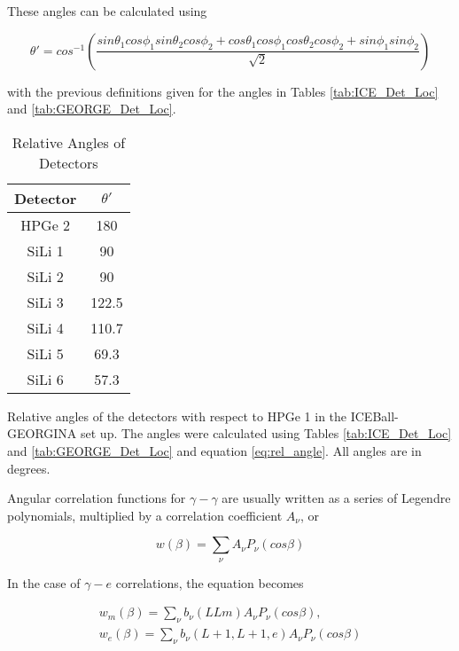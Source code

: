 These angles can be calculated using

\begin{equation}
    \theta ' = cos^{-1}(\frac{sin\theta_1 cos\phi_1 sin\theta_2 cos\phi_2 +cos\theta_1 cos\phi_1 cos\theta_2 cos\phi_2 + sin\phi_1 sin\phi_2}{\sqrt{2}})
    \label{eq:rel_angle}
\end{equation}

with the previous definitions given for the angles in Tables \ref{tab:ICE_Det_Loc} and \ref{tab:GEORGE_Det_Loc}.

\begin{table}[]
    \centering
    \caption{Relative Angles of Detectors}
    \begin{tabular}{c|c} \toprule
         Detector & $\theta '$  \\
         \hline 
         HPGe 2 & 180 \\
         SiLi 1 & 90\\
         SiLi 2 & 90\\
         SiLi 3 & 122.5\\
         SiLi 4 & 110.7\\
         SiLi 5 & 69.3 \\
         SiLi 6 & 57.3 \\ \bottomrule
    \end{tabular}
    \footnotesize
    \item Relative angles of the detectors with respect to HPGe 1 in the ICEBall-GEORGINA set up. The angles were calculated using Tables \ref{tab:ICE_Det_Loc} and \ref{tab:GEORGE_Det_Loc} and equation \ref{eq:rel_angle}. All angles are in degrees.
    \label{tab:rel_angle}
\end{table}

Angular correlation functions for $\gamma-\gamma$ are usually written as a series of Legendre polynomials, multiplied by a correlation coefficient $A_\nu$, or

\begin{equation}
    w(\beta) = \sum_\nu A_\nu P_\nu(cos\beta)
    \label{eq:ge_corr}
\end{equation}

In the case of $\gamma-e$ correlations, the equation becomes 

\begin{equation}
    \begin{split}
        w_m(\beta) = \sum_\nu b_\nu(LLm) A_\nu P_\nu(cos\beta), \\
        w_e(\beta) = \sum_\nu b_\nu(L+1,L+1,e) A_\nu P_\nu(cos\beta)
        \label{eq:e_corr}
    \end{split}
\end{equation}

